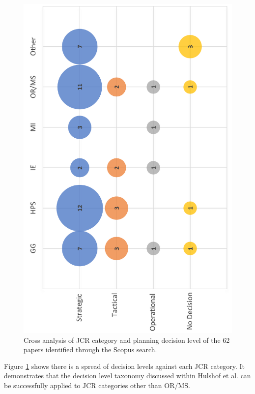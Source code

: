 \documentclass[../thesis.tex]{subfiles}
\begin{document}
\begin{figure}[H]
\centering
 \includegraphics[scale = 0.5,angle=270]{Chapter2/Figures/JCRDecision1.pdf}
 \caption{Cross analysis of JCR category and planning decision level of the 62 papers identified through the Scopus search.}
    \label{fig:PlanningJCR}
\end{figure}

Figure \ref{fig:PlanningJCR} shows there is a spread of decision levels against each JCR category. It demonstrates that the decision level taxonomy discussed within Hulshof et al. \cite{PHulshof} can be successfully applied to JCR categories other than OR/MS. 
\end{document}
